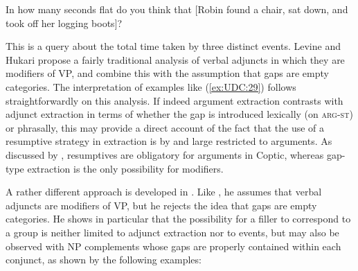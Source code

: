 \documentclass[output=paper
	        ,collection
	        ,collectionchapter
 	        ,biblatex
                ,babelshorthands
                ,newtxmath
                ,draftmode
                ,colorlinks, citecolor=brown
]{langscibook}
\begin{document}
{\begin{exe}
\ex \label{ex:UDC:29}
In how many seconds flat do you think that {[}Robin found a chair,
sat down, and took off her logging boots{]}?
\end{exe}

\noindent
This is a query about the total time taken by three distinct events.
Levine and Hukari propose a fairly traditional analysis of verbal
adjuncts in which they are modifiers of VP, and combine this with the
assumption that gaps are empty categories. The interpretation of
examples like (\ref{ex:UDC:29}) follows straightforwardly on this
analysis. If indeed argument extraction contrasts with adjunct
extraction in terms of whether the gap is introduced  lexically (on
\textsc{arg-st}) or phrasally, this may
provide a direct account of the fact that the use of a resumptive
strategy in extraction is by and large restricted to arguments. As
discussed by \citet{Crysmann:Reintges:14}, resumptives are obligatory
for arguments in Coptic, whereas gap-type extraction is the only
possibility for modifiers.
 

A rather different approach is developed in \citet{Chaves:09}. Like
\citet{Levine:Hukari:06}, he assumes that verbal adjuncts are
modifiers of VP, but he rejects the idea that gaps are empty
categories. He shows in particular that the possibility for a filler
to correspond to a group is neither limited to adjunct extraction nor
to events, but may also be observed with NP complements whose gaps are
properly contained within each conjunct, as shown by the following
examples:

\begin{exe} \ex \begin{xlist} \label{ex:UDC:31}


\end{xlist}
\end{exe}


}
\end{document}
